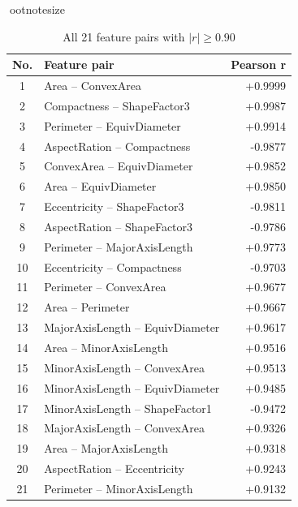 \begin{table}[htbp]
\centering
ootnotesize
\caption{All 21 feature pairs with $|r| \ge 0.90$}
\label{tab:corr_all}
\begin{tabular}{clr}
\toprule
No. & Feature pair & Pearson r \\
\midrule
1 & Area -- ConvexArea & +0.9999 \\
2 & Compactness -- ShapeFactor3 & +0.9987 \\
3 & Perimeter -- EquivDiameter & +0.9914 \\
4 & AspectRation -- Compactness & -0.9877 \\
5 & ConvexArea -- EquivDiameter & +0.9852 \\
6 & Area -- EquivDiameter & +0.9850 \\
7 & Eccentricity -- ShapeFactor3 & -0.9811 \\
8 & AspectRation -- ShapeFactor3 & -0.9786 \\
9 & Perimeter -- MajorAxisLength & +0.9773 \\
10 & Eccentricity -- Compactness & -0.9703 \\
11 & Perimeter -- ConvexArea & +0.9677 \\
12 & Area -- Perimeter & +0.9667 \\
13 & MajorAxisLength -- EquivDiameter & +0.9617 \\
14 & Area -- MinorAxisLength & +0.9516 \\
15 & MinorAxisLength -- ConvexArea & +0.9513 \\
16 & MinorAxisLength -- EquivDiameter & +0.9485 \\
17 & MinorAxisLength -- ShapeFactor1 & -0.9472 \\
18 & MajorAxisLength -- ConvexArea & +0.9326 \\
19 & Area -- MajorAxisLength & +0.9318 \\
20 & AspectRation -- Eccentricity & +0.9243 \\
21 & Perimeter -- MinorAxisLength & +0.9132 \\
\bottomrule
\end{tabular}
\end{table}
